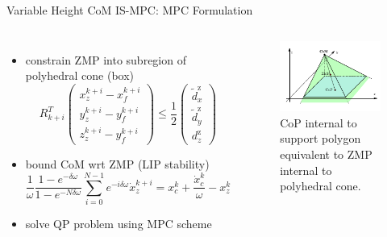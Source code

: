 \documentclass[10pt]{beamer}
\begin{document}
\begin{frame}{Variable Height CoM IS-MPC: MPC Formulation}
  \begin{columns}[c,onlytextwidth]
			\begin{itemize}
			  \item constrain ZMP into subregion of polyhedral cone (box)
					\begin{equation*}
						R_{k+i}^T
						\begin{pmatrix}
							x_z^{k+i} - x_f^{k+i} \\
							y_z^{k+i} - y_f^{k+i} \\
							z_z^{k+i} - y_f^{k+i}
						\end{pmatrix}
						\le
						\frac{1}{2}
						\begin{pmatrix}
							\tilde{d}_x^\text{z} \\
							\tilde{d}_y^\text{z} \\
							d_z^\text{z}
						\end{pmatrix}
					\end{equation*}
				\item bound CoM wrt ZMP (LIP stability)
					\begin{equation*}
						\frac{1}{\omega}\frac{1-e^{-\delta\omega}}{1-e^{-N\delta\omega}}
							\sum_{i=0}^{N-1} e^{-i\delta\omega} \dot{x}_z^{k+i} =
							x_c^k + \frac{\dot{x}_c^k}{\omega} - x_z^k
					\end{equation*}
			  \item solve QP problem using MPC scheme
			\end{itemize}
		  \begin{figure}
				\centering
				\includegraphics[width=\textwidth]{figures/balance3d.pdf}
				\caption{CoP internal to support polygon equivalent to ZMP internal
				    to polyhedral cone.}
				\label{fig:balance3d}
      \end{figure}
	\end{columns}
\end{frame}
\end{document}
